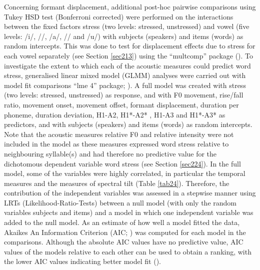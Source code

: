 Concerning formant displacement, additional post-hoc pairwise comparisons using Tukey HSD test (Bonferroni corrected) were performed on the interactions between the fixed factors stress (two levels: stressed, unstressed) and vowel (five levels: /i/, //, /a/, // and /u/) with subjects (speakers) and items (words) as random intercepts. This was done to test for displacement effects due to stress for each vowel separately (see Section \ref{sec213}) using the ``multcomp'' package (\citealt{hothorn_simultaneous_2008}). To investigate the extent to which each of the acoustic measures could predict word stress, generalised linear mixed model (GLMM) analyses were carried out with model fit comparisons ``lme 4'' package; \citealt{bates_fitting_2015}). A full model was created with stress (two levels: stressed, unstressed) as response, and with F0 movement, rise/fall ratio, movement onset, movement offset, formant displacement, duration per phoneme, duration deviation, H1-A2, H1*-A2* , H1-A3 and H1*-A3* as predictors, and with subjects (speakers) and items (words) as random intercepts. Note that the acoustic measures relative F0 and relative intensity were not included in the model as these measures expressed word stress relative to neighbouring syllable(s) and had therefore no predictive value for the dichotomous dependent variable word stress (see Section \ref{sec224}). In the full model, some of the variables were highly correlated, in particular the temporal measures and the measures of spectral tilt (Table \ref{tab24}). Therefore, the contribution of the independent variables was assessed in a stepwise manner using LRTs (Likelihood-Ratio-Tests) between a null model (with only the random variables subjects and items) and a model in which one independent variable was added to the null model. As an estimate of how well a model fitted the data, Akaikes An Information Criterion (AIC; \citealt{akaike_information_1998}) was computed for each model in the comparisons. Although the absolute AIC values have no predictive value, AIC values of the models relative to each other can be used to obtain a ranking, with the lower AIC values indicating better model fit (\citealt{burnham_multimodel_2004}).

